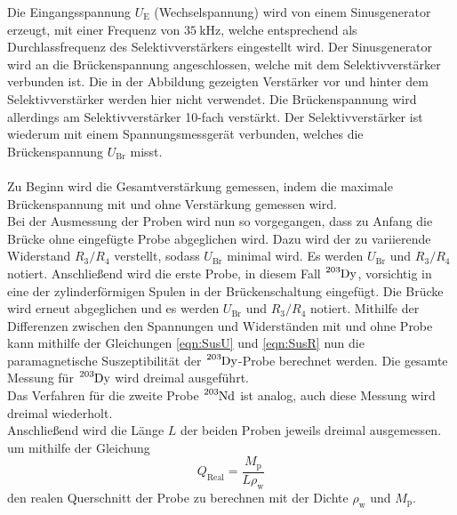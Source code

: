     Die Eingangsspannung $U_\text{E}$ (Wechselspannung) wird von einem Sinusgenerator erzeugt,
    mit einer Frequenz von $\SI{35}{\kilo\hertz}$,
    welche entsprechend als Durchlassfrequenz des Selektivverstärkers eingestellt wird.
    Der Sinusgenerator wird an die Brückenspannung %
    angeschlossen, 
    welche mit dem Selektivverstärker verbunden ist.
    Die in der Abbildung %
    gezeigten Verstärker vor und hinter dem Selektivverstärker werden hier nicht verwendet.
    Die Brückenspannung wird allerdings am Selektivverstärker 10-fach verstärkt.
    Der Selektivverstärker ist wiederum mit einem Spannungsmessgerät verbunden, 
    welches die Brückenspannung $U_\text{Br}$ misst.\\
    \\
    Zu Beginn wird die Gesamtverstärkung gemessen,
    indem die maximale Brückenspannung mit und ohne Verstärkung gemessen wird.\\ 
    Bei der Ausmessung der Proben wird nun so vorgegangen,
    dass zu Anfang die Brücke ohne eingefügte Probe abgeglichen wird.
    Dazu wird der zu variierende Widerstand $R_3/R_4$ verstellt, 
    sodass $U_\text{Br}$ minimal wird.
    Es werden $U_\text{Br}$ und $R_3/R_4$ notiert.
    Anschließend wird die erste Probe,
    in diesem Fall $\ce{^{203}Dy}$,
    vorsichtig in eine der zylinderförmigen Spulen in der Brückenschaltung eingefügt.
    Die Brücke wird erneut abgeglichen und es werden $U_\text{Br}$ und $R_3/R_4$ notiert.
    Mithilfe der Differenzen zwischen den Spannungen und Widerständen mit und ohne Probe 
    kann mithilfe der Gleichungen \eqref{eqn:SusU} und \eqref{eqn:SusR} nun 
    die paramagnetische Suszeptibilität der $\ce{^{203}Dy}$-Probe berechnet werden.
    Die gesamte Messung für $\ce{^{203}Dy}$ wird dreimal ausgeführt.\\
    Das Verfahren für die zweite Probe $\ce{^{203}Nd}$ ist analog,
    auch diese Messung wird dreimal wiederholt.\\
    Anschließend wird die Länge $L$ der beiden Proben jeweils dreimal ausgemessen.
    um mithilfe der Gleichung
    \begin{equation}
        Q_\text{Real} = \frac{M_\text{p}}{L \rho_\text{w}}
    \end{equation}
    den realen Querschnitt der Probe zu berechnen mit der Dichte $\rho_\text{w}$ und $M_\text{p}$.
    